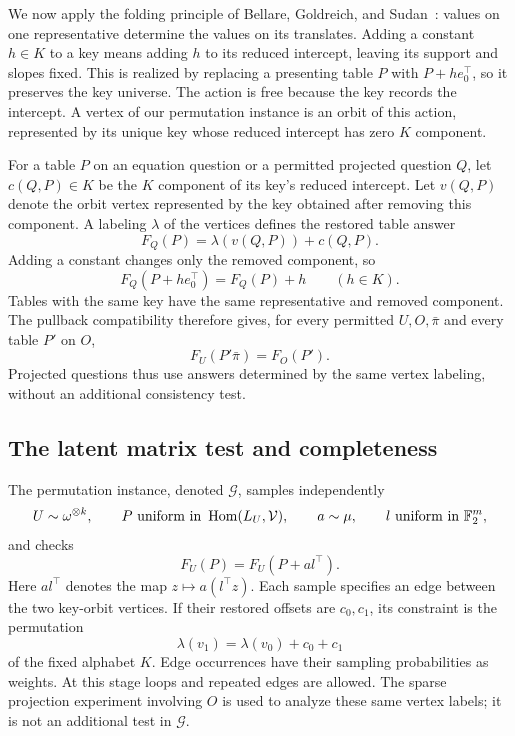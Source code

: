 We now apply the folding principle of Bellare, Goldreich, and
Sudan~\cite[Section~3.3]{BGS98}: values on one representative determine
the values on its translates.  Adding a constant \(h\in K\) to a key
means adding \(h\) to its reduced intercept, leaving its support and
slopes fixed.  This is realized by replacing a presenting table \(P\)
with \(P+h e_0^\top\), so it preserves the key universe.  The action
is free because the key records the intercept.  A vertex of our
permutation instance is an orbit of this action, represented by its unique
key whose reduced intercept has zero \(K\) component.

For a table \(P\) on an equation question or a permitted projected
question \(Q\), let \(c(Q,P)\in K\) be the \(K\) component of
its key's reduced intercept.  Let \(v(Q,P)\) denote the orbit vertex
represented by the key obtained after removing this component.
A labeling \(\lambda\) of the vertices defines the restored table answer
\[
 F_Q(P)=\lambda(v(Q,P))+c(Q,P).
\]
Adding a constant changes only the removed component, so
\begin{equation}
 F_Q(P+h e_0^\top)=F_Q(P)+h
 \qquad(h\in K).
 \label{eq:table-folding}
\end{equation}
Tables with the same key have the same representative and removed
component.  The pullback compatibility therefore gives, for every
permitted \(U,O,\bar\pi\) and every table \(P'\) on \(O\),
\begin{equation}
 F_U(P'\bar\pi)=F_O(P').
 \label{eq:key-sharing}
\end{equation}
Projected questions thus use answers determined by the same vertex
labeling, without an additional consistency test.

\subsection{The latent matrix test and completeness}

The permutation instance, denoted \(\mathcal G\), samples independently
\[
 U\sim\omega^{\otimes k},\qquad
 P\text{ uniform in }\operatorname{Hom}(L_U,\mathcal V),\qquad
 a\sim\mu,\qquad l\text{ uniform in }\mathbb F_2^m,
\]
and checks
\begin{equation}
 F_U(P)=F_U(P+a l^\top).
 \label{eq:matrix-test}
\end{equation}
Here \(a l^\top\) denotes the map \(z\mapsto a(l^\top z)\).
Each sample specifies an edge between the two key-orbit vertices.  If
their restored offsets are \(c_0,c_1\), its constraint is the
permutation
\[
 \lambda(v_1)=\lambda(v_0)+c_0+c_1
\]
of the fixed alphabet \(K\).  Edge occurrences have their sampling
probabilities as weights.  At this stage loops and repeated edges are
allowed.  The sparse projection experiment involving \(O\) is used to
analyze these same vertex labels; it is not an additional test in
\(\mathcal G\).


